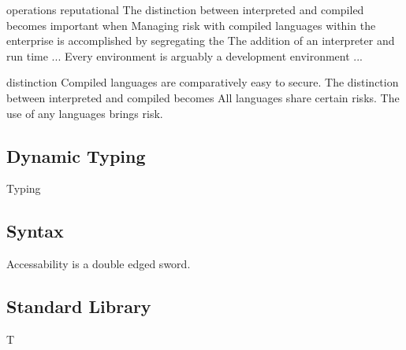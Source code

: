 			operations reputational
			The distinction between interpreted and compiled becomes important when 
			Managing risk with compiled languages within the enterprise is accomplished by segregating the 
			The addition of an interpreter and run time ...
			Every environment is arguably a development environment ...

			distinction
			Compiled languages are comparatively easy to secure.
			The distinction between interpreted and compiled becomes 
			All languages share certain risks.
			The use of any languages brings risk. 
		\fi
			
	\subsection{Dynamic Typing}

		Typing

	\subsection{Syntax}

		Accessability is a double edged sword.

	\subsection{Standard Library}


		T%






